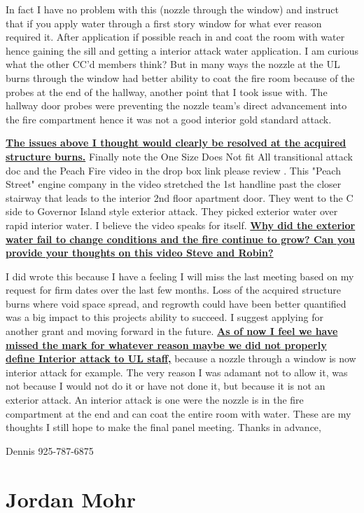 \documentclass[12pt,oneside]{book}
\begin{document}
\begin{appendix}
In fact I have no problem with this (nozzle through the window) and instruct that if you apply water through a first story window for what ever reason required it.  After application if possible reach in and coat the room with water hence gaining the sill and getting a interior attack water application.  I am curious what the other CC'd members think?  But in many ways the nozzle at the UL burns through the window had better ability to coat the fire room because of the probes at the end of the hallway, another point that I took issue with.  The hallway door probes were preventing the nozzle team's direct advancement into the fire compartment hence it was not a good interior gold standard attack.   

\textbf{\ul{The issues above I thought would clearly be resolved at the acquired structure burns.}}  Finally note the One Size Does Not fit All transitional attack doc and the Peach Fire video in the drop box link please review .  This "Peach Street" engine company in the video stretched the 1st handline past the closer stairway that leads to the interior 2nd floor apartment door.  They went to the C side to Governor Island style exterior attack.  They picked exterior water over rapid interior water.  I believe the video speaks for itself.  \textbf{\ul{Why did the exterior water fail to change conditions and the fire continue to grow?  Can you provide your thoughts on this video Steve and Robin?}}  

I did wrote this because I have a feeling I will miss the last meeting based on my request for firm dates over the last few months.  Loss of the acquired structure burns where void space spread, and regrowth could have been better quantified was a big impact to this projects ability to succeed.  I suggest applying for another grant and moving forward in the future.  \textbf{\ul{As of now I feel we have missed the mark for whatever reason maybe we did not properly define Interior attack to UL staff,}} because a nozzle through a window is now interior attack for example.  The very reason I was adamant not to allow it, was not because I would not do it or have not done it, but because it is not an exterior attack.  An interior attack is one were the nozzle is in the fire compartment at the end and can coat the entire room with water.  These are my thoughts I still hope to make the final panel meeting.  
Thanks in advance,

Dennis 925-787-6875

\section{Jordan Mohr}


\end{appendix}
\end{document}
